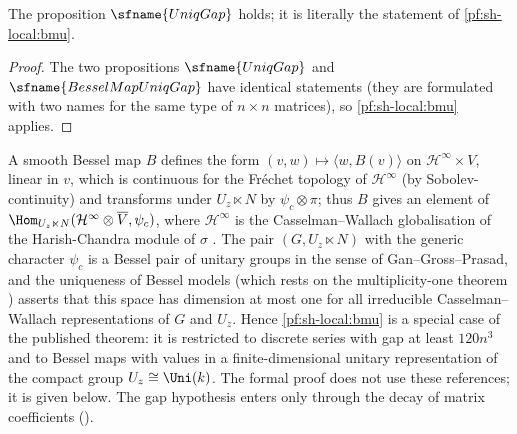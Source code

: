 \begin{corollary}\label{pf:sh-local:uniqgap}
The proposition $\sfname{UniqGap}$ holds; it is literally the statement of \cref{pf:sh-local:bmu}.
\end{corollary}

\begin{proof}
The two propositions $\sfname{UniqGap}$ and $\sfname{BesselMapUniqGap}$ have identical statements (they are
formulated with two names for the same type of $n\times n$ matrices), so \cref{pf:sh-local:bmu} applies.
\end{proof}

\begin{remark}\label{pf:sh-local:rem:bmu}
A smooth Bessel map $B$ defines the form $(v,w)\mapsto\langle w,B(v)\rangle$ on
$\mathcal H^\infty\times V$, linear in $v$, which is continuous for the Fr\'echet topology of $\mathcal H^\infty$ (by
Sobolev-continuity) and transforms under $U_z\ltimes N$ by $\psi_c\otimes\pi$; thus $B$ gives an element of
$\Hom_{U_z\ltimes N}(\mathcal H^\infty\otimes\overline{V},\psi_c)$, where $\mathcal H^\infty$ is the
Casselman--Wallach globalisation of the Harish-Chandra module of $\sigma$ \cite{Wallach1992}. The pair
$(G,U_z\ltimes N)$ with the generic character $\psi_c$ is a Bessel pair of unitary groups in the sense of
Gan--Gross--Prasad, and the uniqueness of Bessel models \cite[Theorem~A]{JiangSunZhu2010} (which rests on the
multiplicity-one theorem \cite{AizenbudGourevitchRallisSchiffmann2010,SunZhu2012}) asserts that this space has
dimension at most one for all irreducible Casselman--Wallach representations of $G$ and $U_z$. Hence
\cref{pf:sh-local:bmu} is a special case of the published theorem: it is restricted to discrete series with gap at
least $120n^3$ and to Bessel maps with values in a finite-dimensional unitary representation of the compact group
$U_z\cong\Uni(k)$. The formal proof does not use these references; it is given below. The gap hypothesis enters
only through the decay of matrix coefficients ().
\end{remark}

